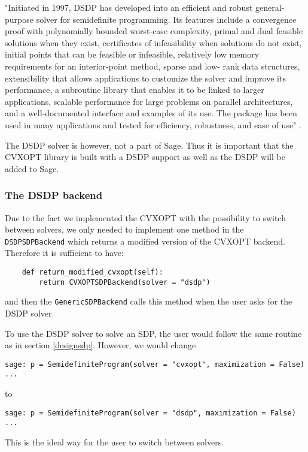 "Initiated in 1997, DSDP has developed into an efficient and
robust general-purpose solver for semidefinite programming. Its features include a convergence
proof with polynomially bounded worst-case complexity, primal and dual feasible solutions when
they exist, certificates of infeasibility when solutions do not exist, initial points that can be feasible
or infeasible, relatively low memory requirements for an interior-point method, sparse and low-
rank data structures, extensibility that allows applications to customize the solver and improve
its performance, a subroutine library that enables it to be linked to larger applications, scalable
performance for large problems on parallel architectures, and a well-documented interface and
examples of its use. The package has been used in many applications and tested for efficiency,
robustness, and ease of use" \cite{dsdp5}.

The DSDP solver is however, not a part of Sage. Thus it is important that the CVXOPT library is built with a DSDP support as well as the DSDP will be added to Sage. 

\subsubsection{The DSDP backend}
Due to the fact we implemented the CVXOPT with the possibility to switch between solvers, we only needed to implement one method in the \texttt{DSDPSDPBackend} which returns a modified version of the CVXOPT backend. Therefore it is sufficient to have:

\begin{verbatim}
    def return_modified_cvxopt(self):
        return CVXOPTSDPBackend(solver = "dsdp")
\end{verbatim}
and then the \texttt{GenericSDPBackend} calls this method when the user asks for the DSDP solver.

To use the DSDP solver to solve an SDP, the user would follow the same routine as in section \ref{designsdp}. However, we would change  
\begin{verbatim}
sage: p = SemidefiniteProgram(solver = "cvxopt", maximization = False)
...
\end{verbatim}
to
\begin{verbatim}
sage: p = SemidefiniteProgram(solver = "dsdp", maximization = False)
...
\end{verbatim}

This is the ideal way for the user to switch between solvers.






